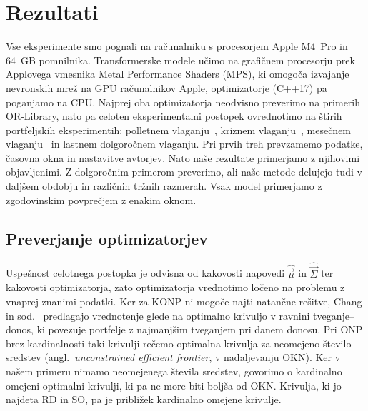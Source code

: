 \documentclass[9pt]{style/friteza}
\begin{document}

\section{Rezultati}\label{sec:rezultati}

Vse eksperimente smo pognali na računalniku s procesorjem Apple M4~Pro in 64~GB pomnilnika. Transformerske modele učimo na grafičnem procesorju prek Applovega vmesnika Metal Performance Shaders (MPS), ki omogoča izvajanje nevronskih mrež na GPU računalnikov Apple, optimizatorje (C++17) pa poganjamo na CPU. Najprej oba optimizatorja neodvisno preverimo na primerih OR-Library, nato pa celoten eksperimentalni postopek ovrednotimo na štirih portfeljskih eksperimentih: polletnem vlaganju~\cite{wang2023oneshot}, kriznem vlaganju~\cite{leow2021}, mesečnem vlaganju~\cite{aprea2026} in lastnem dolgoročnem vlaganju. Pri prvih treh prevzamemo podatke, časovna okna in nastavitve avtorjev. Nato naše rezultate primerjamo z njihovimi objavljenimi. Z dolgoročnim primerom preverimo, ali naše metode delujejo tudi v daljšem obdobju in različnih tržnih razmerah. Vsak model primerjamo z zgodovinskim povprečjem z enakim oknom.


\subsection{Preverjanje optimizatorjev}\label{sec:orlib}

Uspešnost celotnega postopka je odvisna od kakovosti napovedi $\hat{\vec{\mu}}$ in $\hat{\vec{\Sigma}}$ ter kakovosti optimizatorja, zato optimizatorja vrednotimo ločeno na problemu z vnaprej znanimi podatki. Ker za KONP ni mogoče najti natančne rešitve, Chang in sod.~\cite{chang2000} predlagajo vrednotenje glede na optimalno krivuljo v ravnini tveganje--donos, ki povezuje portfelje z najmanjšim tveganjem pri danem donosu. Pri ONP brez kardinalnosti taki krivulji rečemo optimalna krivulja za neomejeno število sredstev (angl.\ \emph{unconstrained efficient frontier}, v nadaljevanju OKN). Ker v našem primeru nimamo neomejenega števila sredstev, govorimo o kardinalno omejeni optimalni krivulji, ki pa ne more biti boljša od OKN. Krivulja, ki jo najdeta RD in SO, pa je približek kardinalno omejene krivulje. 
\end{document}
